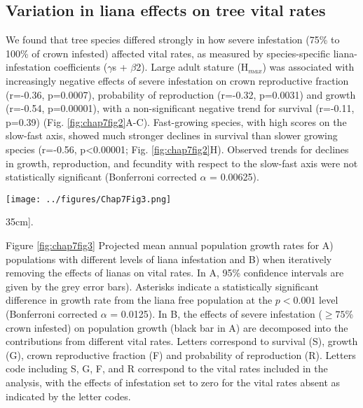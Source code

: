\documentclass[b5paper,justified]{tufte-book} %
\begin{document}
\begin{fullwidth}
\subsection{Variation in liana effects on tree vital rates}
We found that tree species differed strongly in how severe infestation (75\% to 100\% of crown infested) affected vital rates, as measured by species-specific liana-infestation coefficients ($\gamma$s + $\beta$2). Large adult stature (H$_{max}$) was associated with increasingly negative effects of severe infestation on crown reproductive fraction (r=-0.36, p=0.0007), probability of reproduction (r=-0.32, p=0.0031) and growth (r=-0.54, p=0.00001), with a non-significant negative trend for survival (r=-0.11, p=0.39) (Fig. \ref{fig:chap7fig2}A-C). Fast-growing species, with high scores on the slow-fast axis, showed much stronger declines in survival than slower growing species (r=-0.56, p<0.00001; Fig. \ref{fig:chap7fig2}H). Observed trends for declines in growth, reproduction, and fecundity with respect to the slow-fast axis were not statistically significant (Bonferroni corrected $\alpha$ = 0.00625). 

\begin{figure*}
\hspace*{1.5cm}\texttt{[image: ../figures/Chap7Fig3.png]}
\caption[The effects of liana infestation on expected demographic rates as a function of tree size][35cm]{.}
\label{fig:chap7fig3}
\hspace*{0.7cm} \begin{minipage}{12cm}
\footnotesize Figure \ref{fig:chap7fig3} 
Projected mean annual population growth rates for A) populations with different levels of liana infestation and B) when iteratively removing the effects of lianas on vital rates. In A, 95\% confidence intervals are given by the grey error bars). Asterisks indicate a statistically significant difference in growth rate from the liana free population at the $p<0.001$ level (Bonferroni corrected $\alpha$ = 0.0125). In B, the effects of severe infestation ($\geq 75$\% crown infested) on population growth (black bar in A) are decomposed into the contributions from different vital rates. Letters correspond to survival (S), growth (G), crown reproductive fraction (F) and probability of reproduction (R). Letters code including S, G, F, and R correspond to the vital rates included in the analysis, with the effects of infestation set to zero for the vital rates absent as indicated by the letter codes. 
\end{minipage}
\end{figure*}


\end{fullwidth}
\end{document}
